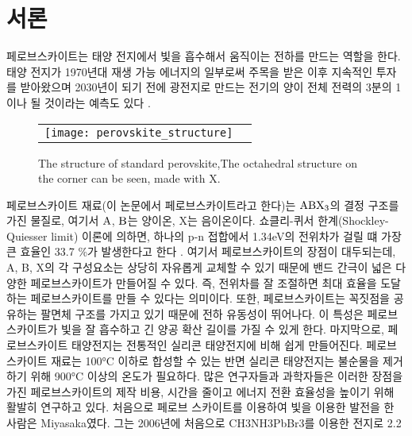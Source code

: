 
\section{서론}

페로브스카이트는 태양 전지에서 빛을 흡수해서 움직이는 전하를 만드는 역할을 한다. 태양 전지가 1970년대 재생 가능 에너지의 일부로써 주목을 받은 이후 지속적인 투자를 받아왔으며 2030년이 되기 전에 광전지로 만드는 전기의 양이 전체 전력의 3분의 1이나 될 것이라는 예측도 있다 \cite{turner2013global}. 
\begin{figure}[h!]
	\begin{center}
		\begin{tabular}{cc}
			\texttt{[image: perovskite\_structure]} 
		\end{tabular}
		\caption{The structure of standard perovskite\cite{turner2013global},The octahedral structure on the corner can be seen, made with X. }	
		\label{fig:FIR22}
	\end{center}
\end{figure}
페로브스카이트 재료(이 논문에서 페로브스카이트라고 한다)는 $\rm{ABX_3}$의 결정 구조를 가진 물질로, 여기서 $\rm{A}$, $\rm{B}$는 양이온, X는 음이온이다. 쇼클리-퀴서 한계(Shockley-Quiesser limit) 이론에 의하면, 하나의 p-n 접합에서 1.34eV의 전위차가 걸릴 떄 가장 큰 효율인 33.7 \%가 발생한다고 한다 \cite{ruhle2016tabulated}. 여기서 페로브스카이트의 장점이 대두되는데, A, B, X의 각 구성요소는 상당히 자유롭게 교체할 수 있기 때문에 밴드 간극이 넓은 다양한 페로브스카이트가 만들어질 수 있다. 즉, 전위차를 잘 조절하면 최대 효율을 도달하는 페로브스카이트를 만들 수 있다는 의미이다. 또한, 페로브스카이트는 꼭짓점을 공유하는 팔면체 구조를 가지고 있기 때문에 전하 유동성이 뛰어나다\cite{linaburg2015studies}. 이 특성은 페로브스카이트가 빛을 잘 흡수하고 긴 양공 확산 길이를 가질 수 있게 한다. 마지막으로, 페로브스카이트 태양전지는 전통적인 실리콘 태양전지에 비해 쉽게 만들어진다. 페로브스카이트 재료는 100°C 이하로 합성할 수 있는 반면 실리콘 태양전지는 불순물을 제거하기 위해 900°C 이상의 온도가 필요하다.
많은 연구자들과 과학자들은 이러한 장점을 가진 페로브스카이트의 제작 비용, 시간을 줄이고 에너지 전환 효율성을 높이기 위해 활발히 연구하고 있다. 처음으로 페로브 스카이트를 이용하여 빛을 이용한 발전을 한 사람은 Miyasaka였다. 그는 2006년에 처음으로 CH3NH3PbBr3를 이용한 전지로 2.2%
